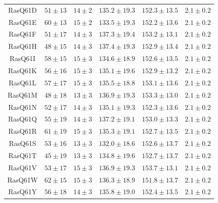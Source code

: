 \begin{table}
\begin{center}
\begin{tabular}{cccccc}
    RasQ61D  & $51 \pm 13$  &  $14 \pm 2$    &  $135.2 \pm 19.3$ & $152.3 \pm 13.5$  & $2.1 \pm 0.2 $              \\  
    RasQ61E  & $60 \pm 13$  &  $15 \pm 2$    &  $133.5 \pm 19.3$ & $152.2 \pm 13.6$  & $2.1 \pm 0.2 $              \\  
    RasQ61F  & $51 \pm 17$  &  $14 \pm 3$    &  $137.3 \pm 19.4$ & $153.2 \pm 13.1$  & $2.1 \pm 0.2 $              \\  
    RasQ61H  & $48 \pm 15$  &  $14 \pm 3$    &  $137.4 \pm 19.3$ & $152.9 \pm 13.4$  & $2.1 \pm 0.2 $              \\  
    RasQ61I  & $58 \pm 15$  &  $15 \pm 3$    &  $134.6 \pm 18.9$ & $152.6 \pm 13.5$  & $2.1 \pm 0.2 $              \\  
    RasQ61K  & $56 \pm 16$  &  $15 \pm 3$    &  $135.1 \pm 19.6$ & $152.9 \pm 13.2$  & $2.1 \pm 0.2 $              \\  
    RasQ61L  & $57 \pm 17$  &  $15 \pm 3$    &  $135.5 \pm 18.8$ & $153.1 \pm 13.6$  & $2.1 \pm 0.2 $              \\  
    RasQ61M  & $48 \pm 18$  &  $13 \pm 3$    &  $136.9 \pm 19.3$ & $153.3 \pm 13.0$  & $2.1 \pm 0.2 $              \\  
    RasQ61N  & $52 \pm 17$  &  $14 \pm 3$    &  $135.1 \pm 19.3$ & $152.3 \pm 13.6$  & $2.1 \pm 0.2 $              \\  
    RasQ61Q  & $55 \pm 19$  &  $14 \pm 3$    &  $137.2 \pm 19.1$ & $153.0 \pm 13.3$  & $2.1 \pm 0.2 $              \\  
    RasQ61R  & $61 \pm 19$  &  $15 \pm 3$    &  $135.3 \pm 19.1$ & $152.7 \pm 13.5$  & $2.1 \pm 0.2 $              \\  
    RasQ61S  & $53 \pm 16$  &  $13 \pm 3$    &  $132.0 \pm 18.6$ & $152.6 \pm 13.7$  & $2.1 \pm 0.2 $              \\  
    RasQ61T  & $45 \pm 19$  &  $13 \pm 3$    &  $134.8 \pm 19.6$ & $152.7 \pm 13.7$  & $2.1 \pm 0.2 $              \\  
    RasQ61V  & $53 \pm 17$  &  $15 \pm 3$    &  $136.9 \pm 19.3$ & $153.7 \pm 13.1$  & $2.1 \pm 0.2 $              \\  
    RasQ61W  & $62 \pm 15$  &  $15 \pm 3$    &  $136.3 \pm 18.9$ & $151.8 \pm 13.7$  & $2.1 \pm 0.2 $              \\  
    RasQ61Y  & $56 \pm 18$  &  $14 \pm 3$    &  $135.8 \pm 19.0$ & $152.4 \pm 13.5$  & $2.1 \pm 0.2 $              \\  
    
    \bottomrule
    \end{tabular}
    \end{center}
    \label{tbl:ras-sasa}
\end{table}

